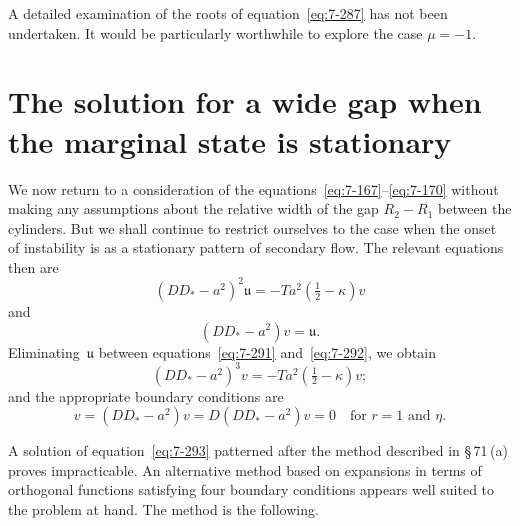 A detailed examination of the roots of equation~\eqref{eq:7-287} has not been
undertaken.  It would be particularly worthwhile to explore the case
$\mu = -1$.

\section{The solution for a wide gap when the marginal state is stationary}\label{sec:7-73}

We now return to a consideration of the equations~\eqref{eq:7-167}--\eqref{eq:7-170} without
making any assumptions about the relative width of the gap $R_2-R_1$
between the cylinders.  But we shall continue to restrict ourselves to the
case when the onset of instability is as a stationary pattern of secondary
flow.  The relevant equations then are
\begin{equation}
\label{eq:7-291}
(DD_*-a^2)^2\mathfrak{u} = -Ta^2\!\left(\tfrac{1}{2}-\kappa\right)v
\end{equation}
and
\begin{equation}
\label{eq:7-292}
(DD_*-a^2)v = \mathfrak{u}.
\end{equation}
Eliminating~$\mathfrak{u}$ between equations~\eqref{eq:7-291} and~\eqref{eq:7-292}, we obtain
\begin{equation}
\label{eq:7-293}
(DD_*-a^2)^3 v = -Ta^2\!\left(\tfrac{1}{2}-\kappa\right)v;
\end{equation}
and the appropriate boundary conditions are
\begin{equation}
\label{eq:7-294}
v = (DD_*-a^2)v = D(DD_*-a^2)v = 0
\quad\text{for } r = 1 \text{ and } \eta.
\end{equation}

A solution of equation~\eqref{eq:7-293} patterned after the method described in
\S\,71\,(a) proves impracticable.  An alternative method based on expansions in terms of orthogonal functions satisfying four boundary conditions
appears well suited to the problem at hand.  The method is the following.


